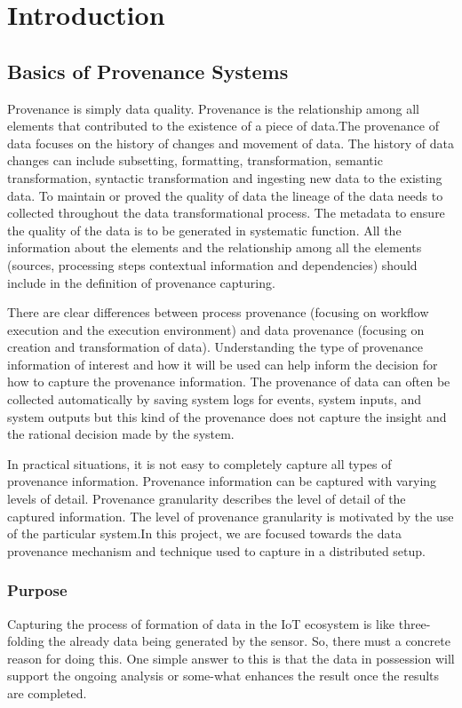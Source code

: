 \chapter{Introduction}




\section{Basics of Provenance Systems}
Provenance is simply data quality. Provenance is the relationship among all elements that contributed to the existence of a piece of data.The provenance of data focuses on the history of changes and movement of data. The history of data changes can include subsetting, formatting, transformation, semantic transformation, syntactic transformation and ingesting new data to the existing data. To maintain or proved the quality of data the lineage of the data needs to collected throughout the data transformational process. The metadata to ensure the quality of the data is to be generated in systematic function. All the information about the elements and the relationship among all the elements (sources, processing steps contextual information and dependencies) should include in the definition of provenance capturing. 


There are clear differences between process provenance (focusing on workflow execution and the execution environment) and data provenance (focusing on creation and transformation of data). Understanding the type of provenance information of interest and how it will be used can help inform the decision for how to capture the provenance information. The provenance of data can often be collected automatically by saving system logs for events, system inputs, and system outputs but this kind of the provenance does not capture the insight and the rational decision made by the system. 

In practical situations, it is not easy to completely capture all types of provenance information. Provenance information can be captured with varying levels of detail.  Provenance granularity describes the level of detail of the captured information. The level of provenance granularity is motivated by the use of the particular system.In this project, we are focused towards the data provenance mechanism and technique used to capture in a distributed setup.

\subsection{Purpose}
Capturing the process of formation of data in the IoT ecosystem is like three-folding the already data being generated by the sensor. So, there must a concrete reason for doing this. One simple answer to this is that the data in possession will support the ongoing analysis or some-what enhances the result once the results are completed.

